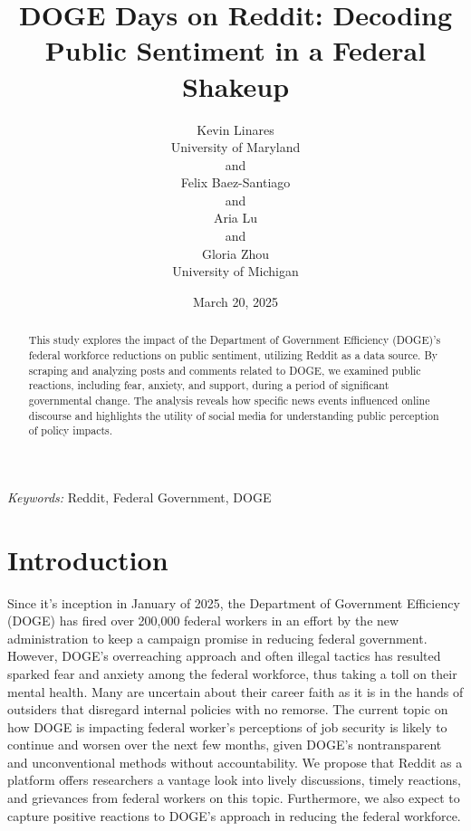 \documentclass[
  12pt]{article}
\begin{document}
\def\spacingset#1{\renewcommand{\baselinestretch}%
{#1}\small\normalsize} \spacingset{1}



\date{March 20, 2025}
\title{\bf DOGE Days on Reddit: Decoding Public Sentiment in a Federal
Shakeup}
\author{
Kevin Linares\\
University of Maryland\\
and\\Felix Baez-Santiago\\
and\\Aria Lu\\
and\\Gloria Zhou\\
University of Michigan\\
}
\maketitle

\bigskip
\bigskip
\begin{abstract}
This study explores the impact of the Department of Government
Efficiency (DOGE)'s federal workforce reductions on public sentiment,
utilizing Reddit as a data source. By scraping and analyzing posts and
comments related to DOGE, we examined public reactions, including fear,
anxiety, and support, during a period of significant governmental
change. The analysis reveals how specific news events influenced online
discourse and highlights the utility of social media for understanding
public perception of policy impacts.
\end{abstract}

\noindent%
{\it Keywords:} Reddit, Federal Government, DOGE
\vfill

\newpage
\spacingset{1.9} %


\section{Introduction}\label{sec-intro}

Since it's inception in January of 2025, the Department of Government
Efficiency (DOGE) has fired over 200,000 federal workers in an effort by
the new administration to keep a campaign promise in reducing federal
government. However, DOGE's overreaching approach and often illegal
tactics has resulted sparked fear and anxiety among the federal
workforce, thus taking a toll on their mental health. Many are uncertain
about their career faith as it is in the hands of outsiders that
disregard internal policies with no remorse. The current topic on how
DOGE is impacting federal worker's perceptions of job security is likely
to continue and worsen over the next few months, given DOGE's
nontransparent and unconventional methods without accountability. We
propose that Reddit as a platform offers researchers a vantage look into
lively discussions, timely reactions, and grievances from federal
workers on this topic. Furthermore, we also expect to capture positive
reactions to DOGE's approach in reducing the federal workforce.
\end{document}
